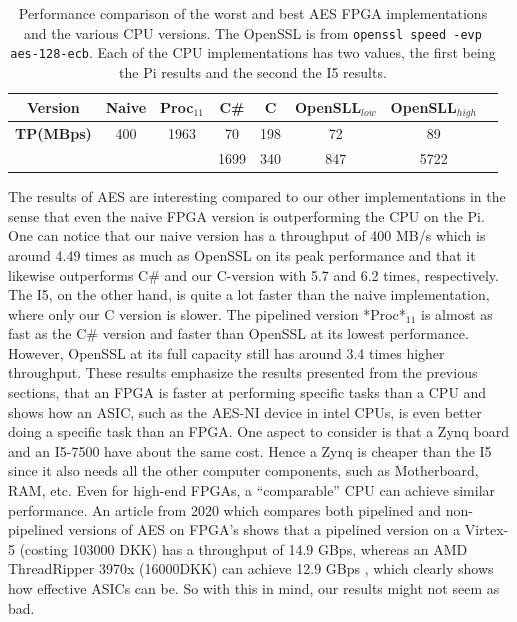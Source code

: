 \documentclass[a4paper, openany]{memoir}
\begin{document}
\begin{abstact}
\begin{table}[H]
\centering
\captionsetup{width=.8\linewidth}
\begin{tabular}{c c c c c c c c}
\hline
\textbf{Version} & Naive & Proc$_{11}$ & C\# & C & OpenSLL$_{low}$ & OpenSLL$_{high}$\\
\hline
\textbf{TP(MBps)} & 400 & 1963 &    70& 198 & 72  & 89\\
                  &     &      & 1699 & 340 & 847 & 5722
\end{tabular}
\caption[AES: FPGA and CPU comparisons]%
{Performance comparison of the worst and best AES FPGA implementations and the various CPU versions. The OpenSSL is from \texttt{openssl speed -evp aes-128-ecb}. Each of the CPU implementations has two values, the first being the Pi results and the second the I5 results.}
\label{tab:AEScompare}
\end{table}
The results of AES are interesting compared to our other implementations in the sense that even the naive FPGA version is outperforming the CPU on the Pi. One can notice that our naive version has a throughput of 400 MB/s which is around 4.49 times as much as OpenSSL on its peak performance and that it likewise outperforms C\# and our C-version with 5.7 and 6.2 times, respectively. The I5, on the other hand, is quite a lot faster than the naive implementation, where only our C version is slower. The pipelined version *Proc*\(_{11}\) is almost as fast as the C\# version and faster than OpenSSL at its lowest performance. However, OpenSSL at its full capacity still has around 3.4 times higher throughput. These results emphasize the results presented from the previous sections, that an FPGA is faster at performing specific tasks than a CPU and shows how an ASIC, such as the AES-NI device in intel CPUs, is even better doing a specific task than an FPGA. One aspect to consider is that a Zynq board and an I5-7500 have about the same cost. Hence a Zynq is cheaper than the I5 since it also needs all the other computer components, such as Motherboard, RAM, etc.
Even for high-end FPGAs, a ``comparable'' CPU can achieve similar performance.
An article from 2020 which compares both pipelined and non-pipelined versions of AES on FPGA's shows that a pipelined version on a Virtex-5 (costing 103000 DKK)\cite{virtex5} has a throughput of 14.9 GBps\cite{Zodpe}, whereas an AMD ThreadRipper 3970x (16000DKK)\cite{threadPrice} can achieve 12.9 GBps \cite{threadripper}, which clearly shows how effective ASICs can be. So with this in mind, our results might not seem as bad.


\end{abstact}
\end{document}
